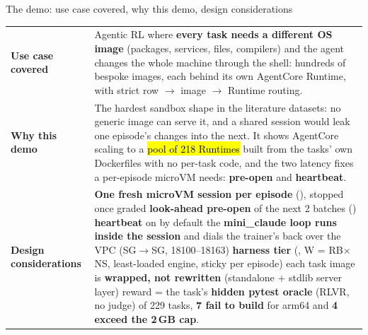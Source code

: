 \begin{frame}{The demo: use case covered, why this demo, design considerations}
\scriptsize\setlength{\tabcolsep}{4pt}
\begin{tabularx}{\textwidth}{@{}P{0.17\textwidth}Y@{}}
\toprule
\textbf{Use case covered} & Agentic RL where \textbf{every task needs a different OS image} (packages, services, files, compilers) and the agent changes the whole machine through the shell: hundreds of bespoke images, each behind its own AgentCore Runtime, with strict row $\rightarrow$ image $\rightarrow$ Runtime routing.\\
\textbf{Why this demo} & The hardest sandbox shape in the literature datasets: no generic image can serve it, and a shared session would leak one episode's changes into the next. It shows AgentCore scaling to a \hl{pool of 218 Runtimes} built from the tasks' own Dockerfiles with no per-task code, and the two latency fixes a per-episode microVM needs: \textbf{pre-open} and \textbf{heartbeat}.\\
\textbf{Design considerations} & \textbf{One fresh microVM session per episode} (), stopped once graded \textperiodcentered{} \textbf{look-ahead pre-open} of the next 2 batches () \textperiodcentered{} \textbf{heartbeat} on by default \textperiodcentered{} the \textbf{mini\_claude loop runs inside the session} and dials the trainer's  back over the VPC (SG$\rightarrow$SG, 18100--18163) \textperiodcentered{} \textbf{harness tier} (, W = RB$\times$NS, least-loaded engine, sticky per episode) \textperiodcentered{} each task image is \textbf{wrapped, not rewritten} (standalone  + stdlib server layer) \textperiodcentered{} reward = the task's \textbf{hidden pytest oracle} (RLVR, no judge) \textperiodcentered{} of 229 tasks, \textbf{7 fail to build} for arm64 and \textbf{4 exceed the 2\,GB cap}.\\
\bottomrule
\end{tabularx}
\end{frame}

